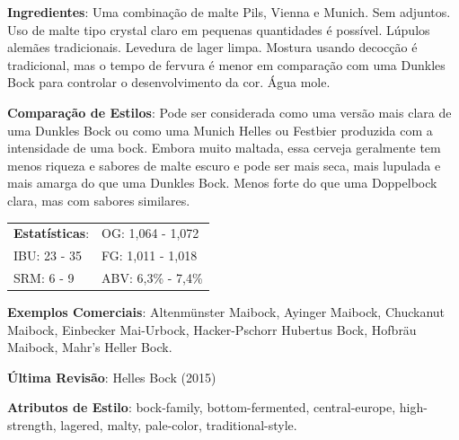 \textbf{Ingredientes}: Uma combinação de malte Pils, Vienna e Munich. Sem adjuntos. Uso de malte tipo crystal claro em pequenas quantidades é possível. Lúpulos alemães tradicionais. Levedura de lager limpa. Mostura usando decocção é tradicional, mas o tempo de fervura é menor em comparação com uma Dunkles Bock para controlar o desenvolvimento da cor. Água mole.

\textbf{Comparação de Estilos}: Pode ser considerada como uma versão mais clara de uma Dunkles Bock ou como uma Munich Helles ou Festbier produzida com a intensidade de uma bock. Embora muito maltada, essa cerveja geralmente tem menos riqueza e sabores de malte escuro e pode ser mais seca, mais lupulada e mais amarga do que uma Dunkles Bock. Menos forte do que uma Doppelbock clara, mas com sabores similares.

\begin{tabular}{@{}p{35mm}p{35mm}@{}}
  \textbf{Estatísticas}: & OG: 1,064 - 1,072 \\
  IBU: 23 - 35  & FG: 1,011 - 1,018  \\
  SRM: 6 - 9  & ABV: 6,3\% - 7,4\%
\end{tabular}

\textbf{Exemplos Comerciais}: Altenmünster Maibock, Ayinger Maibock, Chuckanut Maibock, Einbecker Mai-Urbock, Hacker-Pschorr Hubertus Bock, Hofbräu Maibock, Mahr’s Heller Bock.

\textbf{Última Revisão}: Helles Bock (2015)

\textbf{Atributos de Estilo}: bock-family, bottom-fermented, central-europe, high-strength, lagered, malty, pale-color, traditional-style.
